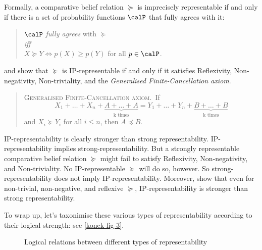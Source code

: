 Formally, a comparative belief relation $\succeq$ is imprecisely representable if and only if there is a set of probability functions $\calP$ that fully agrees with it:
\begin{quote}\centering
$\calP$ \emph{fully agrees} with $\succeq$\\
\emph{iff}\\
$X\succeq Y \Leftrightarrow p(X)\geq p(Y)$ for all $p\in\calP$.
\end{quote}
\citet{Rios1992} and \citet{Alon2014} show that $\succeq$ is IP-representable if and only if it satisfies Reflexivity, Non-negativity, Non-triviality, and the \textit{Generalised Finite-Cancellation axiom}.
\begin{quote}
\textsc{Generalised Finite-Cancellation axiom}.\, If
$$
	X_1+\ldots+X_n+\underbrace{A+\hdots+A}_{\text{k times}} = Y_1+\ldots+Y_n+\underbrace{B+\hdots+B}_{\text{k times}}
$$
and $X_i\succeq Y_i$ for all $i\leq n$, then $A\preceq B$.
\end{quote}

IP-representability is clearly stronger than strong representability. IP-representability implies strong-representability. But a strongly representable comparative belief relation $\succeq$ might fail to satisfy Reflexivity, Non-negativity, and Non-triviality. No IP-representable $\succeq$ will do so, however. So strong-representability does not imply IP-representability. Moreover, \citet{Harrison-Trainor2016} show that even for non-trivial, non-negative, and reflexive $\succeq$, IP-representability is stronger than strong representability.

To wrap up, let's taxonimise these various types of representability according to their logical strength: see \autoref{konek-fig-3}.
\begin{figure}
\centering
{}
\caption{Logical relations between different types of representability}\label{konek-fig-3}
\end{figure}


